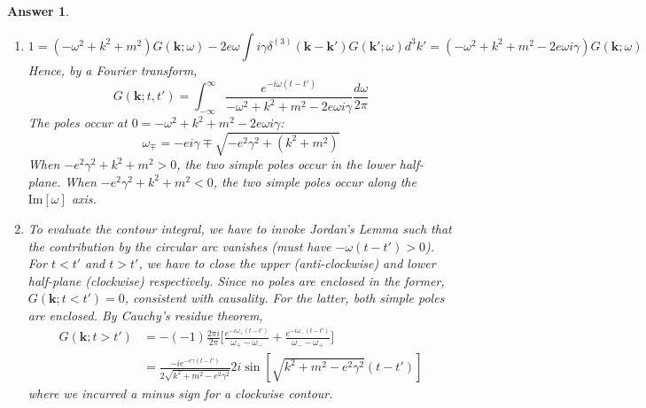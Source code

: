 \documentclass[a4paper]{article}
\newtheorem{ans}{Answer}[section]
\theoremstyle{new}
\begin{document}
\begin{ans}
\begin{enumerate}[label=(\alph*)]
\begin{eqnarray}
\end{eqnarray}
Relabel indices to get the desired result.
\item 
$$1=(-\omega^2+k^2+m^2)G(\mathbf{k};\omega)-2e\omega\int i\gamma\delta^{(3)}(\mathbf{k}-\mathbf{k'})G(\mathbf{k'};\omega)d^3k'=(-\omega^2+k^2+m^2-2e\omega i\gamma)G(\mathbf{k};\omega)$$
Hence, by a Fourier transform,
$$G(\mathbf{k};t,t')=\int_{-\infty}^\infty\frac{e^{-i\omega(t-t')}}{-\omega^2+k^2+m^2-2e\omega i\gamma}\frac{d\omega}{2\pi}$$
The poles occur at $0=-\omega^2+k^2+m^2-2e\omega i\gamma$:
$$\omega_\mp=-ei\gamma\mp\sqrt{-e^2\gamma^2+(k^2+m^2)}$$
When $-e^2\gamma^2+k^2+m^2>0$, the two simple poles occur in the lower half-plane. When $-e^2\gamma^2+k^2+m^2<0$, the two simple poles occur along the $\text{Im}[\omega]$ axis.
\item To evaluate the contour integral, we have to invoke Jordan's Lemma such that the contribution by the circular arc vanishes (must have $-\omega(t-t')>0$). For $t<t'$ and $t>t'$, we have to close the upper (anti-clockwise) and lower half-plane (clockwise) respectively. Since no poles are enclosed in the former, $G(\mathbf{k};t<t')=0$, consistent with causality. For the latter, both simple poles are enclosed. By Cauchy's residue theorem,
\begin{align}
    G(\mathbf{k};t>t')&=-(-1)\frac{2\pi i}{2\pi}\bigg[\frac{e^{-i\omega_+(t-t')}}{\omega_+-\omega_-}+\frac{e^{-i\omega_-(t-t')}}{\omega_--\omega_+}\bigg]\nonumber\\&=\frac{-ie^{-e\gamma(t-t')}}{2\sqrt{k^2+m^2-e^2\gamma^2}}2i\sin[\sqrt{k^2+m^2-e^2\gamma^2}(t-t')]\nonumber
\end{align}
where we incurred a minus sign for a clockwise contour.
\end{enumerate}
\end{ans}
\newpage
\end{document}
